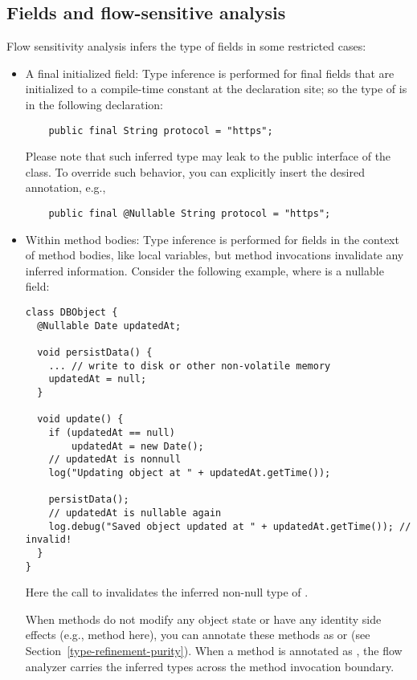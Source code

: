 \subsection{Fields and flow-sensitive analysis\label{type-refinement-fields}}

Flow sensitivity analysis infers the type of fields in some restricted cases:

\begin{itemize}

\item
A final initialized field:
Type inference is performed for final fields that are initialized to a
compile-time constant at the declaration site; so the type of 
is  in the following declaration:

\begin{Verbatim}
    public final String protocol = "https";
\end{Verbatim}

Please note that such inferred type may leak to the public interface of the
class.  To override such behavior, you can explicitly insert the desired
annotation, e.g.,

\begin{Verbatim}
    public final @Nullable String protocol = "https";
\end{Verbatim}

\item
Within method bodies:
Type inference is performed for fields in the context of method bodies,
like local variables, but method invocations invalidate any inferred
information.  Consider the following example, where  is a nullable
field:

\begin{Verbatim}
class DBObject {
  @Nullable Date updatedAt;

  void persistData() {
    ... // write to disk or other non-volatile memory
    updatedAt = null;
  }

  void update() {
    if (updatedAt == null)
        updatedAt = new Date();
    // updatedAt is nonnull
    log("Updating object at " + updatedAt.getTime());

    persistData();
    // updatedAt is nullable again
    log.debug("Saved object updated at " + updatedAt.getTime()); // invalid!
  }
}
\end{Verbatim}

Here the call to  invalidates the inferred non-null type
of .

When methods do not modify any object state or have any identity side
effects (e.g.,  method here), you can annotate these methods as
 or  (see
Section~\ref{type-refinement-purity}).  When a method is annotated as
, the flow analyzer carries the inferred types across
the method invocation boundary.

\end{itemize}


